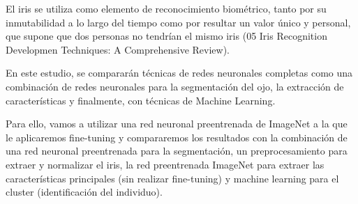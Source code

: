 
El iris se utiliza como elemento de reconocimiento biométrico, tanto por su inmutabilidad a lo largo del tiempo como por resultar un valor único y 
personal, que supone que dos personas no tendrían el mismo iris (05 Iris Recognition Developmen Techniques: A Comprehensive Review).

En este estudio, se compararán técnicas de redes neuronales completas como una combinación de redes neuronales para la segmentación del ojo, la extracción
de características y finalmente, con técnicas de Machine Learning.

Para ello, vamos a utilizar una red neuronal preentrenada de ImageNet a la que le aplicaremos fine-tuning y compararemos los resultados con la combinación de
una red neuronal preentrenada para la segmentación, un preprocesamiento para extraer y normalizar el iris, la red preentrenada ImageNet para extraer las características principales
(sin realizar fine-tuning) y machine learning para el cluster (identificación del individuo).
